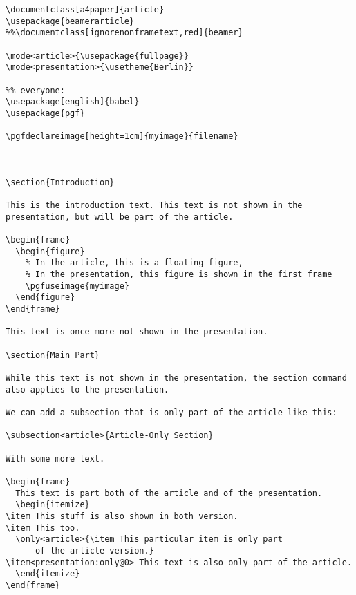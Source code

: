 \begin{Verbatim}
\documentclass[a4paper]{article}
\usepackage{beamerarticle}
%%\documentclass[ignorenonframetext,red]{beamer}

\mode<article>{\usepackage{fullpage}}
\mode<presentation>{\usetheme{Berlin}}

%% everyone:
\usepackage[english]{babel}
\usepackage{pgf}

\pgfdeclareimage[height=1cm]{myimage}{filename}



\section{Introduction}

This is the introduction text. This text is not shown in the
presentation, but will be part of the article.

\begin{frame}
  \begin{figure}
    % In the article, this is a floating figure,
    % In the presentation, this figure is shown in the first frame
    \pgfuseimage{myimage}
  \end{figure}
\end{frame}

This text is once more not shown in the presentation.

\section{Main Part}

While this text is not shown in the presentation, the section command
also applies to the presentation.

We can add a subsection that is only part of the article like this:

\subsection<article>{Article-Only Section}

With some more text.

\begin{frame}
  This text is part both of the article and of the presentation.
  \begin{itemize}
\item This stuff is also shown in both version.
\item This too.
  \only<article>{\item This particular item is only part
      of the article version.}
\item<presentation:only@0> This text is also only part of the article.
  \end{itemize}
\end{frame}

\end{Verbatim}

